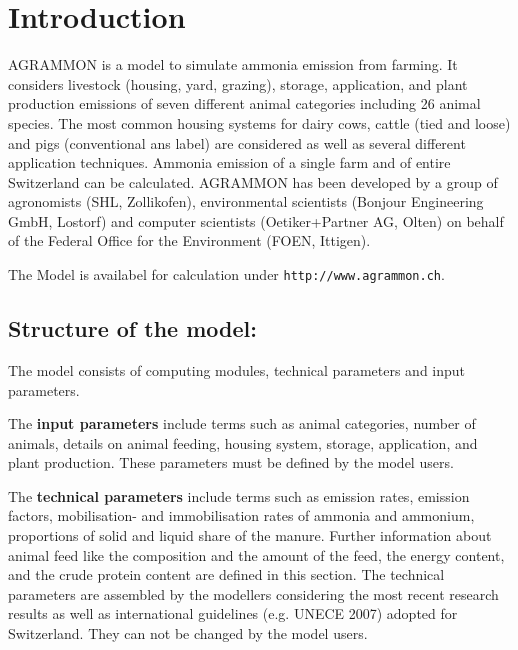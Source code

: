 \section{Introduction}

AGRAMMON is a model to simulate ammonia emission from farming. It
considers livestock (housing, yard, grazing), storage, application,
and plant production emissions of seven different animal categories
including 26 animal species. The most common housing systems for dairy
cows, cattle (tied and loose) and pigs (conventional ans label) are
considered as well as several different application
techniques. Ammonia emission of a single farm and of entire
Switzerland can be calculated. AGRAMMON has been developed by a group
of agronomists (SHL, Zollikofen), environmental scientists (Bonjour
Engineering GmbH, Lostorf) and computer scientists (Oetiker+Partner
AG, Olten) on behalf of the Federal Office for the Environment (FOEN,
Ittigen).

The Model is availabel for calculation under \texttt{http://www.agrammon.ch}.


\subsection{Structure of the model:}
The model consists of computing modules, technical parameters and input
parameters. 

\vspace{3ex}


\noindent The \textbf{input parameters} include terms such as animal
categories, number of animals, details on animal feeding, housing
system, storage, application, and plant production. These parameters
must be defined by the model users.

\vspace{3ex}

\noindent The \textbf{technical parameters} include terms such as
emission rates, emission factors, mobilisation- and immobilisation
rates of ammonia and ammonium, proportions of solid and liquid share
of the manure. Further information about animal feed like the
composition and the amount of the feed, the energy content, and the
crude protein content are defined in this section. The technical
parameters are assembled by the modellers considering the most recent
research results as well as international guidelines (e.g. UNECE 2007)
adopted for Switzerland. They can not be changed by the model users.

\vspace{3ex}

